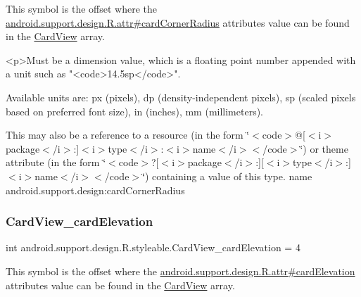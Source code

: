 This symbol is the offset where the \hyperlink{classandroid_1_1support_1_1design_1_1R_1_1attr_a0892312691f51ddd1d073df8df17e82a}{android.\+support.\+design.\+R.\+attr\#card\+Corner\+Radius} attribute\textquotesingle{}s value can be found in the \hyperlink{classandroid_1_1support_1_1design_1_1R_1_1styleable_a56025691fb136d28dc5fce5a25d7c65e}{Card\+View} array.

\begin{DoxyVerb}      <p>Must be a dimension value, which is a floating point number appended with a unit such as "<code>14.5sp</code>".
\end{DoxyVerb}
 Available units are\+: px (pixels), dp (density-\/independent pixels), sp (scaled pixels based on preferred font size), in (inches), mm (millimeters). 

This may also be a reference to a resource (in the form \char`\"{}$<$code$>$@\mbox{[}$<$i$>$package$<$/i$>$\+:\mbox{]}$<$i$>$type$<$/i$>$\+:$<$i$>$name$<$/i$>$$<$/code$>$\char`\"{}) or theme attribute (in the form \char`\"{}$<$code$>$?\mbox{[}$<$i$>$package$<$/i$>$\+:\mbox{]}\mbox{[}$<$i$>$type$<$/i$>$\+:\mbox{]}$<$i$>$name$<$/i$>$$<$/code$>$\char`\"{}) containing a value of this type.  name android.\+support.\+design\+:card\+Corner\+Radius \mbox{\label{classandroid_1_1support_1_1design_1_1R_1_1styleable_ab1f403337584c00422841622610e14b3}} 
\subsubsection{\texorpdfstring{Card\+View\+\_\+card\+Elevation}{CardView\_cardElevation}}
{\footnotesize\ttfamily int android.\+support.\+design.\+R.\+styleable.\+Card\+View\+\_\+card\+Elevation = 4\hspace{0.3cm}{\ttfamily [static]}}

This symbol is the offset where the \hyperlink{classandroid_1_1support_1_1design_1_1R_1_1attr_a98e65155e8f567fb4f1f99d3cef046d2}{android.\+support.\+design.\+R.\+attr\#card\+Elevation} attribute\textquotesingle{}s value can be found in the \hyperlink{classandroid_1_1support_1_1design_1_1R_1_1styleable_a56025691fb136d28dc5fce5a25d7c65e}{Card\+View} array.


